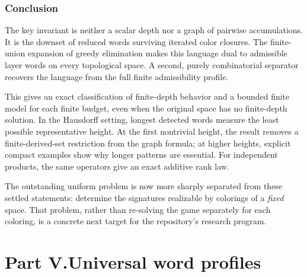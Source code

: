 \documentclass[11pt,letterpaper]{article}
\numberwithin{equation}{section}
\theoremstyle{definition}
\theoremstyle{remark}
\theoremstyle{definition}
\begin{document}
\section{Conclusion}
\label{cw:sec:conclusion}

The key invariant is neither a scalar depth nor a graph of pairwise
accumulations. It is the downset of reduced words surviving iterated color
closures. The finite-union expansion of greedy elimination makes this
language dual to admissible layer words on every topological space. A second,
purely combinatorial separator recovers the language from the full finite
admissibility profile.

This gives an exact classification of finite-depth behavior and a bounded
finite model for each finite budget, even when the original space has no
finite-depth solution. In the Hausdorff setting, longest detected words
measure the least possible representative height. At the first nontrivial
height, the result removes a finite-derived-set restriction from the graph
formula; at higher heights, explicit compact examples show why longer
patterns are essential. For independent products, the same operators give
an exact additive rank law.

The outstanding uniform problem is now more sharply separated from these
settled statements: determine the signatures realizable by colorings of a
\emph{fixed} space. That problem, rather than re-solving the game separately
for each coloring, is a concrete next target for the repository's research
program.

\clearpage
{}\part*{Part V.\quad Universal word profiles}
\end{document}
